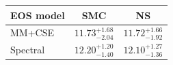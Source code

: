 \renewcommand{\arraystretch}{1.4}
\begin{tabular}{lcc}
    \hline
    EOS model & SMC & NS \\
    \hline
    MM+CSE & $11.73^{+1.68}_{-2.04}$ & $11.72^{+1.66}_{-1.92}$ \\
    Spectral & $12.20^{+1.20}_{-1.40}$ & $12.10^{+1.27}_{-1.36}$ \\
    \hline
\end{tabular}
